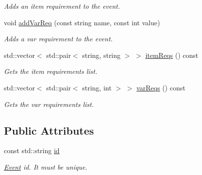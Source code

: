\begin{DoxyCompactItemize}
\begin{DoxyCompactList}\small\item\em Adds an item requirement to the event. \item\end{DoxyCompactList}\item 
\hypertarget{classEvent_a9c23b1394b22ba045447d8cf0ae53a82}{
void \hyperlink{classEvent_a9c23b1394b22ba045447d8cf0ae53a82}{addVarReq} (const string name, const int value)}
\label{classEvent_a9c23b1394b22ba045447d8cf0ae53a82}

\begin{DoxyCompactList}\small\item\em Adds a var requirement to the event. \item\end{DoxyCompactList}\item 
\hypertarget{classEvent_ad6b224463b52873c983caa580073ebc7}{
std::vector$<$ std::pair$<$ string, string $>$ $>$ \hyperlink{classEvent_ad6b224463b52873c983caa580073ebc7}{itemReqs} () const }
\label{classEvent_ad6b224463b52873c983caa580073ebc7}

\begin{DoxyCompactList}\small\item\em Gets the item requirements list. \item\end{DoxyCompactList}\item 
\hypertarget{classEvent_ad0d65d3da1a760ff239ad3977c16d9b6}{
std::vector$<$ std::pair$<$ string, int $>$ $>$ \hyperlink{classEvent_ad0d65d3da1a760ff239ad3977c16d9b6}{varReqs} () const }
\label{classEvent_ad0d65d3da1a760ff239ad3977c16d9b6}

\begin{DoxyCompactList}\small\item\em Gets the var requirements list. \item\end{DoxyCompactList}\end{DoxyCompactItemize}
\subsection*{Public Attributes}
\begin{DoxyCompactItemize}
\item 
\hypertarget{classEvent_a8566f6b1af844306a135e4bc2d2cad62}{
const std::string \hyperlink{classEvent_a8566f6b1af844306a135e4bc2d2cad62}{id}}
\label{classEvent_a8566f6b1af844306a135e4bc2d2cad62}

\begin{DoxyCompactList}\small\item\em \hyperlink{classEvent}{Event} id. It must be unique. \item\end{DoxyCompactList}\end{DoxyCompactItemize}


